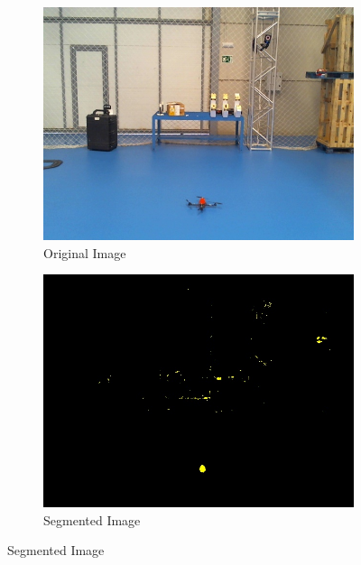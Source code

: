 	\begin{figure}[h]
		\centering
		\begin{subfigure}{0.49\linewidth}
			\includegraphics[width=\linewidth]{../Images/c4/image_ori}
			\caption{Original Image}
			\label{fig:image_ori}
		\end{subfigure}
		\begin{subfigure}{0.49\linewidth}
			\includegraphics[width=\linewidth]{../Images/c4/image_seg}
			\caption{Segmented Image}
			\label{fig:image_seg}
		\end{subfigure}
	\end{figure}
	
